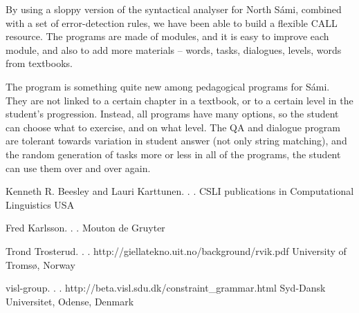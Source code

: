 \documentclass[11pt]{article}
\begin{document}
By using a sloppy version of the syntactical analyser for North Sámi, combined with a set of error-detection rules, we have been able to build a flexible CALL resource. The programs are made of modules, and it is easy to improve each module, and also to add more materials -- words, tasks, dialogues, levels, words from textbooks. 

The program is something quite new among pedagogical programs for Sámi. They are not linked to a certain chapter in a textbook, or to a certain level in the student's progression. Instead, all programs have many options, so the student can choose what to exercise, and on what level. The QA and dialogue program are tolerant towards variation in student answer (not only string matching), and the random generation of tasks more or less in all of the programs, the student can use them over and over again. 



\begin{thebibliography}{}

{Kenneth R. Beesley and Lauri Karttunen}.
.
.
\newblock CSLI publications in Computational Linguistics
\newblock USA


{Fred Karlsson}.
.
.
\newblock Mouton de Gruyter

{Trond Trosterud}.
.
.
\newblock http://giellatekno.uit.no/background/rvik.pdf
\newblock University of Tromsø, Norway

{visl-group}.
.
.
\newblock http://beta.visl.sdu.dk/constraint\_grammar.html
\newblock Syd-Dansk Universitet, Odense, Denmark


\end{thebibliography}


%
%



	
\end{document}
